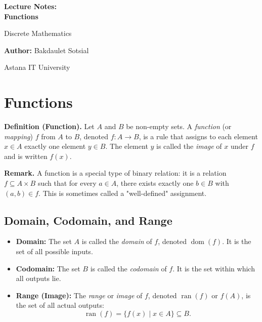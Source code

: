 \documentclass[11pt,a4paper]{article}
\begin{document}
\begin{titlepage}
    \centering
    \vspace*{4cm}
    
    {\Huge\bfseries Lecture Notes:\\ Functions\par}
    \vspace{1cm}
    {\Large Discrete Mathematics\par}
    \vspace{2cm}
    {\large \textbf{Author:} Bakdaulet Sotsial\par}
    \vspace{1cm}
    
    \vfill
    {\small Astana IT University \par}
    \vspace*{2cm}
\end{titlepage}

\tableofcontents
\newpage

\section{Functions}

\textbf{Definition (Function).} Let $A$ and $B$ be non-empty sets. A \textit{function} (or \textit{mapping}) $f$ from $A$ to $B$, denoted $f: A \to B$, is a rule that assigns to each element $x \in A$ exactly one element $y \in B$. The element $y$ is called the \textit{image} of $x$ under $f$ and is written $f(x)$.

\textbf{Remark.} A function is a special type of binary relation: it is a relation $f \subseteq A \times B$ such that for every $a \in A$, there exists exactly one $b \in B$ with $(a, b) \in f$. This is sometimes called a "well-defined" assignment.

\subsection{Domain, Codomain, and Range}

\begin{itemize}[label=\(\triangleright\)]
    \item \textbf{Domain:} The set $A$ is called the \textit{domain} of $f$, denoted $\operatorname{dom}(f)$. It is the set of all possible inputs.
    \item \textbf{Codomain:} The set $B$ is called the \textit{codomain} of $f$. It is the set within which all outputs lie.
    \item \textbf{Range (Image):} The \textit{range} or \textit{image} of $f$, denoted $\operatorname{ran}(f)$ or $f(A)$, is the set of all actual outputs:
    \begin{equation*}
        \operatorname{ran}(f) = \{f(x) \mid x \in A\} \subseteq B.
    \end{equation*}
\end{itemize}
\end{document}

